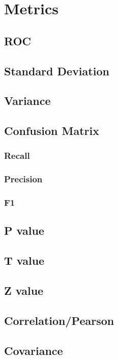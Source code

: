 \graphicspath{%
{chapter2graph/}%
{chapter2graph/bg/}}


\chapter{Metrics}



\section{ROC}

\section{Standard Deviation}

\section{Variance}

\section{Confusion Matrix}

\subsection{Recall}

\subsection{Precision}

\subsection{F1}

\section{P value}

\section{T value}

\section{Z value}

\section{Correlation/Pearson}

\section{Covariance}



